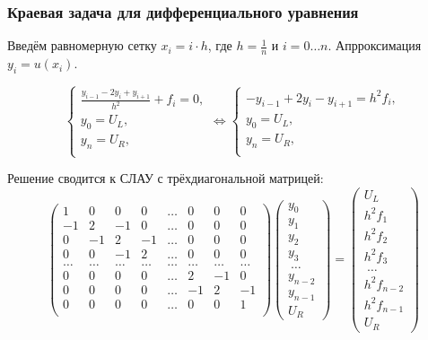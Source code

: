 \documentclass[10pt]{beamer}
\begin{document}
\begin{frame}[fragile]
\frametitle{Краевая задача для дифференциального уравнения}
Введём равномерную сетку $x_i = i \cdot h$, где $h = \frac{1}{n}$ и $i = 0 \ldots n$. Апрроксимация $y_i = u(x_i)$.

$$
\begin{cases}
\frac{y_{i-1} - 2 y_i + y_{i+1}}{h^2} + f_i = 0,\\
y_0 = U_L,\\
y_{n} = U_R,\\
\end{cases}
\Leftrightarrow
\begin{cases}
-y_{i-1} + 2 y_i - y_{i+1} = h^2 f_i,\\
y_0 = U_L,\\
y_{n} = U_R,\\
\end{cases}
$$

Решение сводится к СЛАУ с трёхдиагональной матрицей:
$$
\begin{pmatrix}
1 & 0 & 0 & 0 & \ldots & 0 & 0 & 0 \\
-1 & 2 & -1 & 0 & \ldots & 0 & 0 & 0 \\
0 & -1 & 2 & -1 & \ldots & 0 & 0 & 0 \\
0 & 0 & -1 & 2 & \ldots & 0 & 0 & 0 \\
\ldots & \ldots & \ldots & \ldots & \ldots & \ldots & \ldots & \ldots \\
0 & 0 & 0 & 0 & \ldots & 2 & -1 & 0 \\
0 & 0 & 0 & 0 & \ldots & -1 & 2 & -1 \\
0 & 0 & 0 & 0 & \ldots & 0 & 0 & 1 \\
\end{pmatrix}
\begin{pmatrix}
y_0\\
y_1 \\
y_2 \\
y_3 \\\
\ldots\\
y_{n-2} \\
y_{n-1} \\
U_R
\end{pmatrix}
=
\begin{pmatrix}
U_L\\
h^2 f_1 \\
h^2 f_2 \\
h^2 f_3 \\\
\ldots\\
h^2 f_{n-2} \\
h^2 f_{n-1} \\
U_R
\end{pmatrix}
$$
\end{frame}
\end{document}
